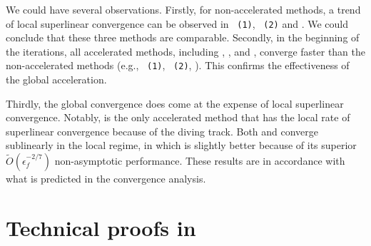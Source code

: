 \documentclass{article}
\begin{document}
We could have several observations. Firstly, for non-accelerated methods, a trend of local superlinear convergence can be observed in \utr{}~\texttt{(1)}, \utr{}~\texttt{(2)} and \arc{}. We could conclude that these three methods are comparable.
Secondly, in the beginning of the iterations, all accelerated methods, including \atr{}, \atrms{}, and \arca{}, converge faster than the non-accelerated methods (e.g., \utr{}~\texttt{(1)}, \utr{}~\texttt{(2)}, \arc{}). This confirms the effectiveness of the global acceleration.

Thirdly, the global convergence does come at the expense of local superlinear convergence.
Notably, \atr{} is the only accelerated method that has the local rate of superlinear convergence because of the diving track.
Both \atrms{} and \arca{} converge sublinearly in the local regime, in which \atrms{} is slightly better because of its superior $\tilde O(\epsilon_f^{-2/7})$ non-asymptotic performance. These results are in accordance with what is predicted in the convergence analysis.

\newpage
{}



\newpage
\appendix
\section{Technical proofs in~}\label{sec.proof pre}
\end{document}
